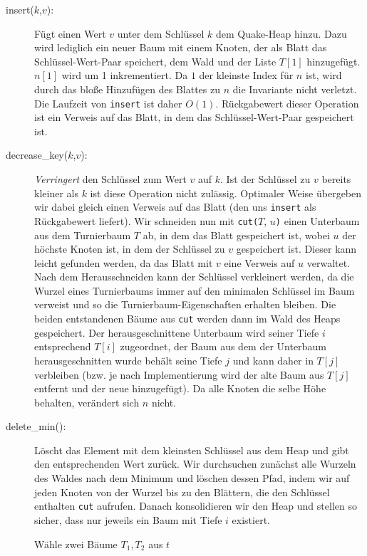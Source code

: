 \documentclass[a4paper,10pt]{article}
\begin{document}
\begin{description}
\item[insert($k$,$v$):]
    Fügt einen Wert $v$ unter dem Schlüssel $k$ dem Quake-Heap hinzu. 
    Dazu wird lediglich ein neuer Baum mit einem Knoten, der als Blatt das Schlüssel-Wert-Paar speichert, dem Wald und der Liste $T[1]$ hinzugefügt. 
    $n[1]$ wird um 1 inkrementiert. 
    Da $1$ der kleinste Index für $n$ ist, wird durch das bloße Hinzufügen des Blattes zu $n$ die Invariante nicht verletzt.
    Die Laufzeit von \verb!insert! ist daher $O(1)$. 
    Rückgabewert dieser Operation ist ein Verweis auf das Blatt, in dem das Schlüssel-Wert-Paar gespeichert ist.
\item[decrease\_key($k$,$v$):]
    \emph{Verringert} den Schlüssel zum Wert $v$ auf $k$. Ist der Schlüssel zu $v$ bereits kleiner als $k$ ist diese Operation nicht zulässig.
    Optimaler Weise übergeben wir dabei gleich einen Verweis auf das Blatt (den uns \verb!insert! als Rückgabewert liefert).
    Wir schneiden nun mit \verb!cut(!$T$, $u$\verb!)! einen Unterbaum aus dem Turnierbaum $T$ ab, in dem das Blatt gespeichert ist, wobei $u$ der höchste Knoten ist, in dem der Schlüssel zu $v$ gespeichert ist.
    Dieser kann leicht gefunden werden, da das Blatt mit $v$ eine Verweis auf $u$ verwaltet.
    Nach dem Herausschneiden kann der Schlüssel verkleinert werden, da die Wurzel eines Turnierbaums immer auf den minimalen Schlüssel im Baum verweist und so die Turnierbaum-Eigenschaften erhalten bleiben.
    Die beiden entstandenen Bäume aus \verb!cut! werden dann im Wald des Heaps gespeichert. 
    Der herausgeschnittene Unterbaum wird seiner Tiefe $i$ entsprechend $T[i]$ zugeordnet, der Baum aus dem der Unterbaum herausgeschnitten wurde behält seine Tiefe $j$ und kann daher in $T[j]$ verbleiben (bzw. je nach Implementierung wird der alte Baum aus $T[j]$ entfernt und der neue hinzugefügt). 
    Da alle Knoten die selbe Höhe behalten, verändert sich $n$ nicht. 
\item[delete\_min():]
    Löscht das Element mit dem kleinsten Schlüssel aus dem Heap und gibt den entsprechenden Wert zurück.
    Wir durchsuchen zunächst alle Wurzeln des Waldes nach dem Minimum und löschen dessen Pfad, indem wir auf jeden Knoten von der Wurzel bis zu den Blättern, die den Schlüssel enthalten \verb!cut! aufrufen.
    Danach konsolidieren wir den Heap und stellen so sicher, dass nur jeweils ein Baum mit Tiefe $i$ existiert.
    \begin{algorithmic}
            \STATE Wähle zwei Bäume $T_1, T_2$ aus $t$

\end{algorithmic}
\end{description}
\end{document}
